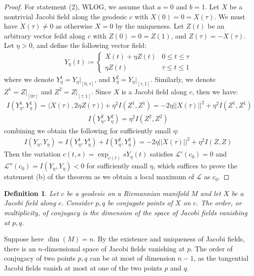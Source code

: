 \documentclass[11pt]{book}
\theoremstyle{break}
\theoremstyle{break}
\newtheorem{defn}{Definition}[corL]
\begin{document}
\begin{proof}
For statement (2), WLOG, we assume that $a = 0$ and $b = 1$. Let $X$ be a nontrivial Jacobi field along the geodesic $c$ with $X(0) = 0 = X(\tau)$. We must have $\dot{X}(\tau) \neq 0$ as otherwise $X = 0$ by the uniqueness. Let $Z(t)$ be an arbitrary vector feild along $c$ with $Z(0) = 0 = Z(1)$, and $Z(\tau) = -\dot{X}(\tau)$. Let $\eta > 0$, and define the following vector field:
\begin{align*}
Y_{\eta}(t) \coloneqq \begin{cases}
X(t) + \eta Z(t) & 0\leq t \leq \tau\\
\eta Z(t) & \tau \leq t \leq 1
\end{cases}
\end{align*}  
where we denote $Y_{\eta}^1 = Y_\eta|_{[0,\tau]}$, and $Y_{\eta}^2=Y_{\eta}|_{[\tau,1]}$. Similarly, we denote $Z^1 = Z|_{[0\tau]}$ and $Z^2 = Z|_{[\tau,1]}$. Since $X$ is a Jacobi field along $c$, then we have:
\begin{align*}
I(Y_{\eta}^1, Y_{\eta}^1) = \langle \dot{X}(\tau) , 2\eta Z(\tau)\rangle + \eta^2 I(Z^1,Z^1) =- 2\eta||\dot{X}(\tau)||^2 + \eta^2 I(Z^1,Z^1)
\end{align*}
\begin{align*}
I(Y^2_\eta, Y_\eta^2) = \eta^2 I(Z^2,Z^2)
\end{align*}
combining we obtain the following for sufficiently small $\eta$:
\begin{align*}
I(Y_{\eta},Y_{\eta}) = I(Y_{\eta}^1 , Y_{\eta}^1) + I(Y_{\eta}^2 ,Y_{\eta}^2) = -2\eta||\dot{X}(\tau)||^2 + \eta^2 I(Z,Z)
\end{align*}
Then the variation $c(t,s) = \exp_{c(t)}sY_{\eta}(t)$ satisfies $\mathcal{L}'(c_0) = 0$ and $\mathcal{L}''(c_0) = I(Y_{\eta}, Y_{\eta}) < 0$ for sufficiently small $\eta$, which suffices to prove the statement (b) of the theorem as we obtain a local maximum of $\mathcal{L}$ as $c_0$. 
\end{proof}


\begin{defn}
Let $c$ be a geodesic on a Riemannian manifold $M$ and let $X$ be a Jacobi field along $c$. Consider $p,q$ be conjugate points of $X$ on $c$. The order, or multiplicity, of conjugacy is the dimension of the space of Jacobi fields vanishing at $p,q$.  
\end{defn}
Suppose here $\dim(M) = n$. By the existence and uniqueness of Jacobi fields, there is an $n$-dimensional space of Jacobi fields vanishing at $p$. The order of conjugacy of two points $p,q$ can be at most of dimension $n-1$, as the tangential Jacobi fields vanish at most at one of the two points $p$ and $q$.\\
\end{document}
